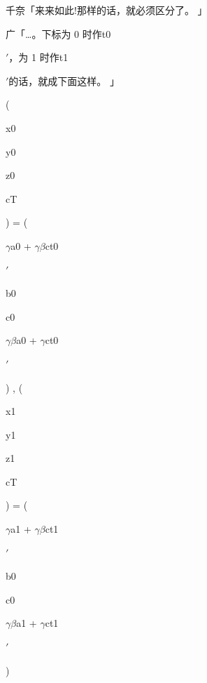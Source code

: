 千奈「来来如此!那样的话，就必须区分了。 」\par
广「…。下标为 0 时作t0\par
$\prime$，为 1 时作t1\par
$\prime$的话，就成下面这样。 」\par
(\par
x0\par
y0\par
z0\par
cT\par
) = (\par
$\gamma$a0 + $\gamma$$\beta$ct0\par
$\prime$\par
b0\par
c0\par
$\gamma$$\beta$a0 + $\gamma$ct0\par
$\prime$\par
) , (\par
x1\par
y1\par
z1\par
cT\par
) = (\par
$\gamma$a1 + $\gamma$$\beta$ct1\par
$\prime$\par
b0\par
c0\par
$\gamma$$\beta$a1 + $\gamma$ct1\par
$\prime$\par
)\par

